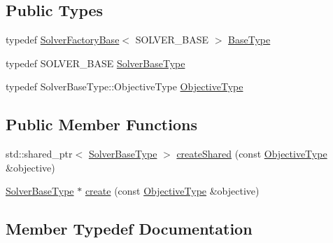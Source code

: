 \subsection*{Public Types}
\begin{DoxyCompactItemize}
\item 
typedef \hyperlink{classnifty_1_1graph_1_1opt_1_1common_1_1SolverFactoryBase}{Solver\+Factory\+Base}$<$ S\+O\+L\+V\+E\+R\+\_\+\+B\+A\+SE $>$ \hyperlink{classnifty_1_1graph_1_1opt_1_1common_1_1PySolverFactoryBase_abb618d7bbfb7624d95cfb118270cc3cd}{Base\+Type}
\item 
typedef S\+O\+L\+V\+E\+R\+\_\+\+B\+A\+SE \hyperlink{classnifty_1_1graph_1_1opt_1_1common_1_1PySolverFactoryBase_afeccce26248d50a8541e9644b96a2085}{Solver\+Base\+Type}
\item 
typedef Solver\+Base\+Type\+::\+Objective\+Type \hyperlink{classnifty_1_1graph_1_1opt_1_1common_1_1PySolverFactoryBase_a180b2e32de5993ef4c58de788dfaac82}{Objective\+Type}
\end{DoxyCompactItemize}
\subsection*{Public Member Functions}
\begin{DoxyCompactItemize}
\item 
std\+::shared\+\_\+ptr$<$ \hyperlink{classnifty_1_1graph_1_1opt_1_1common_1_1SolverFactoryBase_a83f347591f4cffa7afb13c8f495dcce2}{Solver\+Base\+Type} $>$ \hyperlink{classnifty_1_1graph_1_1opt_1_1common_1_1PySolverFactoryBase_a5a45a0822389b91bfb143ee1150633be}{create\+Shared} (const \hyperlink{classnifty_1_1graph_1_1opt_1_1common_1_1SolverFactoryBase_ab71d93640cf3fbc0bc980450d5db6e45}{Objective\+Type} \&objective)
\item 
\hyperlink{classnifty_1_1graph_1_1opt_1_1common_1_1SolverFactoryBase_a83f347591f4cffa7afb13c8f495dcce2}{Solver\+Base\+Type} $\ast$ \hyperlink{classnifty_1_1graph_1_1opt_1_1common_1_1PySolverFactoryBase_a4d2362161eba8c351f771687f8bbbe87}{create} (const \hyperlink{classnifty_1_1graph_1_1opt_1_1common_1_1SolverFactoryBase_ab71d93640cf3fbc0bc980450d5db6e45}{Objective\+Type} \&objective)
\end{DoxyCompactItemize}


\subsection{Member Typedef Documentation}
\mbox{\label{classnifty_1_1graph_1_1opt_1_1common_1_1PySolverFactoryBase_abb618d7bbfb7624d95cfb118270cc3cd}} 
